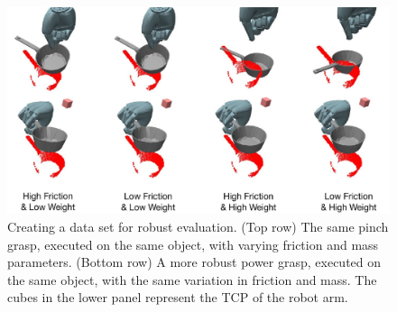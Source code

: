 \begin{figure}[t]
\begin{center}
\includegraphics[width=0.8\columnwidth]{images/frictionweight}
\end{center}
\caption{Creating a data set for robust evaluation. (Top row) The same pinch grasp, executed on the same object, with varying friction and mass parameters. (Bottom row) A more robust power grasp, executed on the same object, with the same variation in friction and mass. The cubes in the lower panel represent the TCP of the robot arm.\label{fig:evaluative-training}}
\end{figure}

